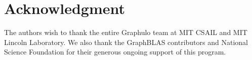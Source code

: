 \documentclass[conference]{IEEEtran}
\begin{document}
%





\section*{Acknowledgment}

The authors wish to thank the entire Graphulo team at MIT CSAIL and
MIT Lincoln Laboratory. We also thank the GraphBLAS contributors and
National Science Foundation for their generous ongoing support of this program.



%
%
%
\end{document}
